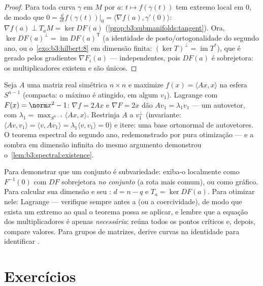 \begin{proof}
Para toda curva $\gamma$ em $M$ por $a$: $t \mapsto
f(\gamma(t))$ tem extremo
local em $0$, de modo que $0 =
\frac{\dd}{\dd t}f(\gamma(t))\big|_0 = \langle\nabla f(a),
\gamma'(0)\rangle$: $\nabla f(a) \perp T_aM = \ker DF(a)$ (\cref{prop:b3:submanifolds:tangent}). Ora, $\ker DF(a)^\perp
= \operatorname{im}DF(a)^{\mathsf T}$
(a identidade de posto/ortogonalidade do segundo ano, ou
o~\cref{exo:b3:hilbert:8} em dimensão finita: $(\ker T)^\perp = \operatorname{im}T^*$), que é gerado pelos
gradientes $\nabla F_i(a)$ --- independentes, pois $DF(a)$ é sobrejetora: os
multiplicadores existem e são únicos.
\end{proof}

\begin{example}
\label{ex:b3:submanifolds:rayleigh}
Seja $A$ uma matriz real simétrica $n\times n$ e maximize $f(x) = \langle Ax, x\rangle$ na esfera
$S^{n-1}$ (compacta: o máximo é atingido, em algum $v_1$). Lagrange com
$F(x) = \norm x^2 - 1$: $\nabla f = 2Ax$ e $\nabla F =
2x$ dão $Av_1 = \lambda_1v_1$ --- um autovetor, com $\lambda_1 = \max_{S^{n-1}}\langle Ax, x\rangle$. Restrinja
$A$ a $v_1^\perp$ (invariante: $\langle Av, v_1\rangle =
\langle v, Av_1\rangle = \lambda_1\langle v, v_1\rangle = 0$) e itere: uma base ortonormal de
autovetores. O teorema espectral do segundo ano, redemonstrado por pura
otimização --- e a sombra em dimensão infinita do mesmo argumento
demonstrou o~\cref{lem:b3:spectral:existence}.
\end{example}

\begin{method}\label{met:b3:submanifolds:method}
Para demonstrar que um conjunto é subvariedade: exiba-o localmente como
$F^{-1}(0)$ com $DF$ sobrejetora \emph{no conjunto} (a rota mais comum),
ou como gráfico. Para calcular sua dimensão e seu :
$d = n - q$ e $T_a = \ker DF(a)$. Para otimizar nele: Lagrange --- verifique sempre antes a
 (ou a coercividade), de modo que exista um extremo ao qual o
teorema possa se aplicar, e lembre que a equação dos multiplicadores é
apenas \emph{necessária}: reúna todos os pontos críticos e, depois,
compare valores. Para grupos de matrizes, derive curvas na identidade
para identificar .
\end{method}

\section{Exercícios}

